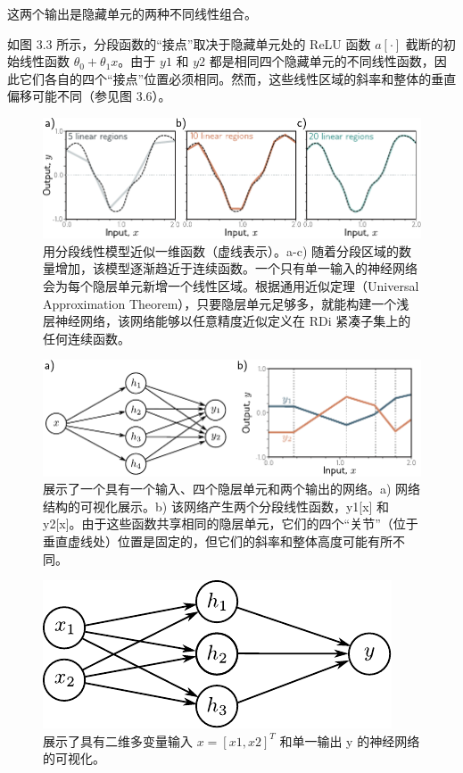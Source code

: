 \documentclass[lang=cn,newtx,10pt,scheme=chinese]{elegantbook}
\begin{document}
这两个输出是隐藏单元的两种不同线性组合。

如图 3.3 所示，分段函数的“接点”取决于隐藏单元处的 ReLU 函数 \(a[\cdot]\) 截断的初始线性函数 \(\theta_0 + \theta_1x\)。由于 \(y1\) 和 \(y2\) 都是相同四个隐藏单元的不同线性函数，因此它们各自的四个“接点”位置必须相同。然而，这些线性区域的斜率和整体的垂直偏移可能不同（参见图 3.6）。

\begin{figure}[ht!]
	\centering
	\includegraphics[width=0.7\linewidth]{PDFFigures/UDLChap3PDF/ShallowApproximate.pdf}
\caption{用分段线性模型近似一维函数（虚线表示）。a-c) 随着分段区域的数量增加，该模型逐渐趋近于连续函数。一个只有单一输入的神经网络会为每个隐层单元新增一个线性区域。根据通用近似定理（Universal Approximation Theorem），只要隐层单元足够多，就能构建一个浅层神经网络，该网络能够以任意精度近似定义在 RDi 紧凑子集上的任何连续函数。}
\end{figure}

\begin{figure}[ht!]
	\centering
	\includegraphics[width=0.7\linewidth]{PDFFigures/UDLChap3PDF/ShallowNetTwoOutputs.pdf}
\caption{展示了一个具有一个输入、四个隐层单元和两个输出的网络。a) 网络结构的可视化展示。b) 该网络产生两个分段线性函数，y1[x] 和 y2[x]。由于这些函数共享相同的隐层单元，它们的四个“关节”（位于垂直虚线处）位置是固定的，但它们的斜率和整体高度可能有所不同。}
\end{figure}

\begin{figure}[ht!]
	\centering
	\includegraphics[width=0.7\linewidth]{PDFFigures/UDLChap3PDF/ShallowNetTwoInputs.pdf}
\caption{展示了具有二维多变量输入 $x = [x1, x2]^T$ 和单一输出 y 的神经网络的可视化。}
\end{figure}
\end{document}
